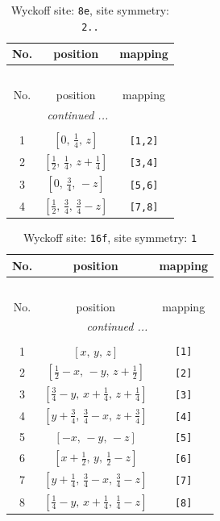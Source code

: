 \documentclass[fleqn,8pt]{jsarticle}
\begin{document}
\renewcommand{\arraystretch}{1.2}
\begin{longtable}{ccc}
\caption{Wyckoff site: {\tt 8e}, site symmetry: {\tt 2..}}
 \\
 \hline \hline
No. & position & mapping \\ \hline \endfirsthead

\multicolumn{2}{l}{\tablename\ \thetable{}} \\
 \hline \hline
No. & position & mapping \\ \hline \endhead

 \hline \hline
\multicolumn{2}{r}{\footnotesize\it continued ...} \\ \endfoot

 \hline \hline
\multicolumn{2}{r}{} \\ \endlastfoot

1 & $\left[ 0,\, \frac{1}{4},\, z \right]$ & {\tt [1,2]} \\ \hline
2 & $\left[ \frac{1}{2},\, \frac{1}{4},\, z + \frac{1}{4} \right]$ & {\tt [3,4]} \\ \hline
3 & $\left[ 0,\, \frac{3}{4},\, - z \right]$ & {\tt [5,6]} \\ \hline
4 & $\left[ \frac{1}{2},\, \frac{3}{4},\, \frac{3}{4} - z \right]$ & {\tt [7,8]} \\
\end{longtable}
\renewcommand{\arraystretch}{1.2}
\begin{longtable}{ccc}
\caption{Wyckoff site: {\tt 16f}, site symmetry: {\tt 1}}
 \\
 \hline \hline
No. & position & mapping \\ \hline \endfirsthead

\multicolumn{2}{l}{\tablename\ \thetable{}} \\
 \hline \hline
No. & position & mapping \\ \hline \endhead

 \hline \hline
\multicolumn{2}{r}{\footnotesize\it continued ...} \\ \endfoot

 \hline \hline
\multicolumn{2}{r}{} \\ \endlastfoot

1 & $\left[ x,\, y,\, z \right]$ & {\tt [1]} \\ \hline
2 & $\left[ \frac{1}{2} - x,\, - y,\, z + \frac{1}{2} \right]$ & {\tt [2]} \\ \hline
3 & $\left[ \frac{3}{4} - y,\, x + \frac{1}{4},\, z + \frac{1}{4} \right]$ & {\tt [3]} \\ \hline
4 & $\left[ y + \frac{3}{4},\, \frac{3}{4} - x,\, z + \frac{3}{4} \right]$ & {\tt [4]} \\ \hline
5 & $\left[ - x,\, - y,\, - z \right]$ & {\tt [5]} \\ \hline
6 & $\left[ x + \frac{1}{2},\, y,\, \frac{1}{2} - z \right]$ & {\tt [6]} \\ \hline
7 & $\left[ y + \frac{1}{4},\, \frac{3}{4} - x,\, \frac{3}{4} - z \right]$ & {\tt [7]} \\ \hline
8 & $\left[ \frac{1}{4} - y,\, x + \frac{1}{4},\, \frac{1}{4} - z \right]$ & {\tt [8]} \\
\end{longtable}
\end{document}
